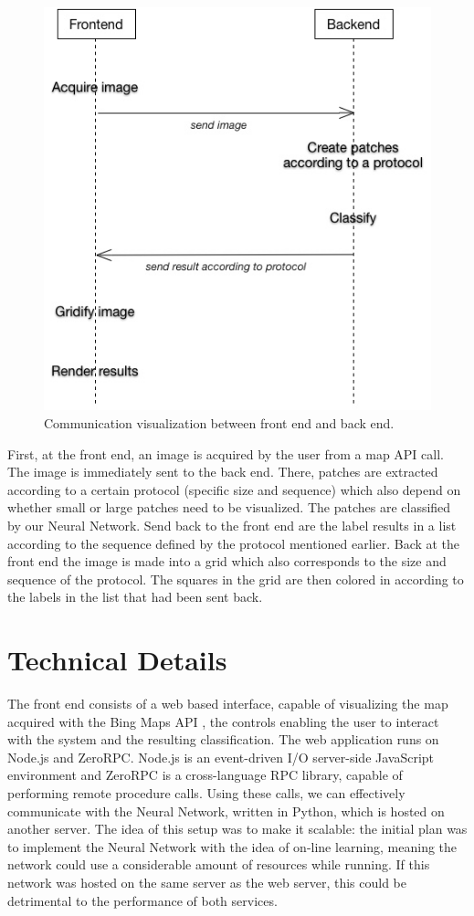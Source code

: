 \documentclass[a4paper,onecolumn]{report}
\begin{document}
\begin{figure}[h!]
    \centering
    \includegraphics[scale=0.5]{./images/communication2.jpg}
    \caption{Communication visualization between front end and back end.}
	\label{fig:communication}
\end{figure}
\noindent
First, at the front end, an image is acquired by the user from a map API call. The image is immediately sent to the back end. There, patches are extracted according to a certain protocol (specific size and sequence) which also depend on whether small or large patches need to be visualized. The patches are classified by our Neural Network. Send back to the front end are the label results in a list according to the sequence defined by the protocol mentioned earlier. Back at the front end the image is made into a grid which also corresponds to the size and sequence of the protocol. The squares in the grid are then colored in according to the labels in the list that had been sent back.

\section{Technical Details}
The front end consists of a web based interface, capable of visualizing the map acquired with the Bing Maps API \cite{bing}, the controls enabling the user to interact with the system and the resulting classification. The web application runs on Node.js and ZeroRPC. Node.js is an event-driven I/O server-side JavaScript environment and ZeroRPC is a cross-language RPC library, capable of performing remote procedure calls. Using these calls, we can effectively communicate with the Neural Network, written in Python, which is hosted on another server. The idea of this setup was to make it scalable: the initial plan was to implement the Neural Network with the idea of on-line learning, meaning the network could use a considerable amount of resources while running. If this network was hosted on the same server as the web server, this could be detrimental to the performance of both services.
\end{document}
